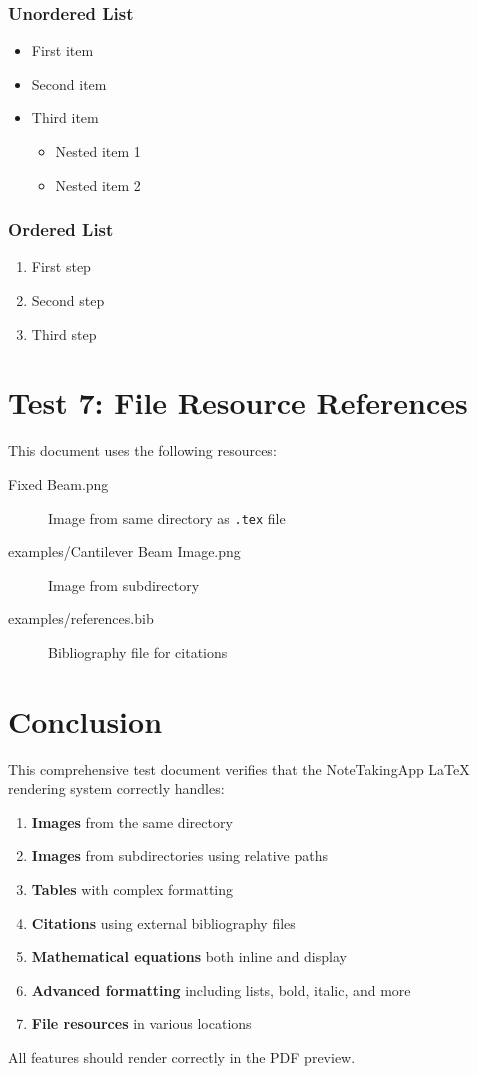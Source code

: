 \documentclass[12pt]{article}
\begin{document}
\subsubsection{Unordered List}
\begin{itemize}
    \item First item
    \item Second item
    \item Third item
        \begin{itemize}
            \item Nested item 1
            \item Nested item 2
        \end{itemize}
\end{itemize}

\subsubsection{Ordered List}
\begin{enumerate}
    \item First step
    \item Second step
    \item Third step
\end{enumerate}

\section{Test 7: File Resource References}

This document uses the following resources:

\begin{description}
    \item[Fixed Beam.png] Image from same directory as \texttt{.tex} file
    \item[examples/Cantilever Beam Image.png] Image from subdirectory
    \item[examples/references.bib] Bibliography file for citations
\end{description}

\section{Conclusion}

This comprehensive test document verifies that the NoteTakingApp LaTeX rendering system correctly handles:

\begin{enumerate}
    \item \textbf{Images} from the same directory
    \item \textbf{Images} from subdirectories using relative paths
    \item \textbf{Tables} with complex formatting
    \item \textbf{Citations} using external bibliography files
    \item \textbf{Mathematical equations} both inline and display
    \item \textbf{Advanced formatting} including lists, bold, italic, and more
    \item \textbf{File resources} in various locations
\end{enumerate}

All features should render correctly in the PDF preview.
\end{document}
